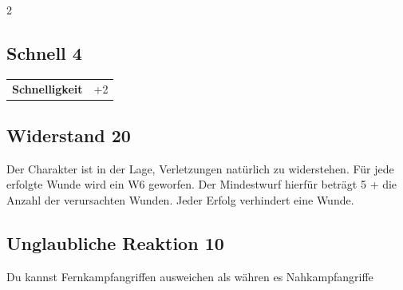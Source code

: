 \begin{multicols}{2}
\begin{tcolorbox}
\end{tcolorbox}

\begin{tcolorbox}
    \subsection*{Schnell \hfill \small{4 }}
    \tcblower




\begin{tabular}{@{}ll@{}}
    \textbf{Schnelligkeit} & +2\\
\end{tabular}


\end{tcolorbox}

\begin{tcolorbox}
    \subsection*{Widerstand \hfill \small{20 }}
    \tcblower
Der Charakter ist in der Lage, Verletzungen natürlich zu widerstehen. Für jede erfolgte Wunde wird ein W6 geworfen. Der Mindestwurf hierfür beträgt 5 + die Anzahl der verursachten Wunden. Jeder Erfolg verhindert eine Wunde.


\vspace{3mm}



\end{tcolorbox}

\begin{tcolorbox}
    \subsection*{Unglaubliche Reaktion \hfill \small{10 }}
    \tcblower
Du kannst Fernkampfangriffen ausweichen als währen es Nahkampfangriffe


\vspace{3mm}




\end{tcolorbox}
\end{multicols}
